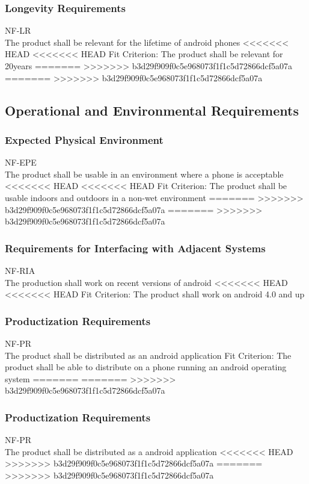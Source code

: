 \documentclass[12pt, titlepage]{article}
\begin{document}
\subsubsection{Longevity Requirements}
NF-LR \\
The product shall be relevant for the lifetime of android phones
<<<<<<< HEAD
<<<<<<< HEAD
{\color{red}Fit Criterion: The product shall be relevant for 20years  }
=======
>>>>>>> b3d29f909f0c5e968073f1f1c5d72866dcf5a07a
=======
>>>>>>> b3d29f909f0c5e968073f1f1c5d72866dcf5a07a


\subsection{Operational and Environmental Requirements}

\subsubsection{Expected Physical Environment}
NF-EPE \\
The product shall be usable in an environment where a phone is acceptable 
<<<<<<< HEAD
<<<<<<< HEAD
{\color{red}Fit Criterion: The product shall be usable indoors and outdoors in a non-wet environment}
=======
>>>>>>> b3d29f909f0c5e968073f1f1c5d72866dcf5a07a
=======
>>>>>>> b3d29f909f0c5e968073f1f1c5d72866dcf5a07a

\subsubsection{Requirements for Interfacing with Adjacent Systems}
NF-RIA \\
The production shall work on recent versions of android
<<<<<<< HEAD
<<<<<<< HEAD
{\color{red}Fit Criterion: The product shall work on android 4.0 and up }

 \subsubsection{Productization Requirements}
 NF-PR \\
The product shall be distributed as an android application 
{\color{red}Fit Criterion: The product shall be able to distribute on a phone running an android operating system }
=======
=======
>>>>>>> b3d29f909f0c5e968073f1f1c5d72866dcf5a07a

 \subsubsection{Productization Requirements}
 NF-PR \\
The product shall be distributed as a android application 
<<<<<<< HEAD
>>>>>>> b3d29f909f0c5e968073f1f1c5d72866dcf5a07a
=======
>>>>>>> b3d29f909f0c5e968073f1f1c5d72866dcf5a07a
\end{document}
